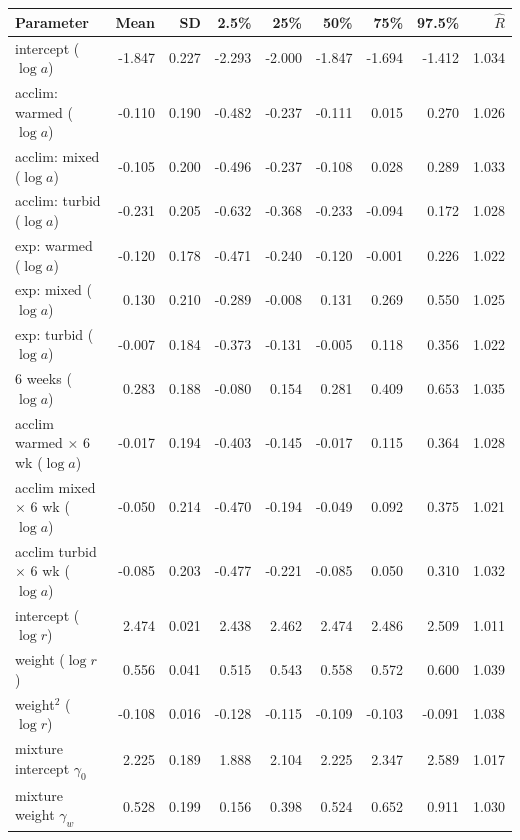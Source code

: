 \begin{tabular}{lrrrrrrrr}
\toprule
Parameter & Mean & SD & 2.5\% & 25\% & 50\% & 75\% & 97.5\% & $\hat{R}$ \\
\midrule
intercept ($\log a$) & -1.847 & 0.227 & -2.293 & -2.000 & -1.847 & -1.694 & -1.412 & 1.034 \\
acclim: warmed ($\log a$) & -0.110 & 0.190 & -0.482 & -0.237 & -0.111 & 0.015 & 0.270 & 1.026 \\
acclim: mixed ($\log a$) & -0.105 & 0.200 & -0.496 & -0.237 & -0.108 & 0.028 & 0.289 & 1.033 \\
acclim: turbid ($\log a$) & -0.231 & 0.205 & -0.632 & -0.368 & -0.233 & -0.094 & 0.172 & 1.028 \\
exp: warmed ($\log a$) & -0.120 & 0.178 & -0.471 & -0.240 & -0.120 & -0.001 & 0.226 & 1.022 \\
exp: mixed ($\log a$) & 0.130 & 0.210 & -0.289 & -0.008 & 0.131 & 0.269 & 0.550 & 1.025 \\
exp: turbid ($\log a$) & -0.007 & 0.184 & -0.373 & -0.131 & -0.005 & 0.118 & 0.356 & 1.022 \\
6 weeks ($\log a$) & 0.283 & 0.188 & -0.080 & 0.154 & 0.281 & 0.409 & 0.653 & 1.035 \\
acclim warmed $\times$ 6 wk ($\log a$) & -0.017 & 0.194 & -0.403 & -0.145 & -0.017 & 0.115 & 0.364 & 1.028 \\
acclim mixed $\times$ 6 wk ($\log a$) & -0.050 & 0.214 & -0.470 & -0.194 & -0.049 & 0.092 & 0.375 & 1.021 \\
acclim turbid $\times$ 6 wk ($\log a$) & -0.085 & 0.203 & -0.477 & -0.221 & -0.085 & 0.050 & 0.310 & 1.032 \\
intercept ($\log r$) & 2.474 & 0.021 & 2.438 & 2.462 & 2.474 & 2.486 & 2.509 & 1.011 \\
weight ($\log r$) & 0.556 & 0.041 & 0.515 & 0.543 & 0.558 & 0.572 & 0.600 & 1.039 \\
weight$^2$ ($\log r$) & -0.108 & 0.016 & -0.128 & -0.115 & -0.109 & -0.103 & -0.091 & 1.038 \\
mixture intercept $\gamma_0$ & 2.225 & 0.189 & 1.888 & 2.104 & 2.225 & 2.347 & 2.589 & 1.017 \\
mixture weight $\gamma_w$ & 0.528 & 0.199 & 0.156 & 0.398 & 0.524 & 0.652 & 0.911 & 1.030 \\
\bottomrule
\end{tabular}
